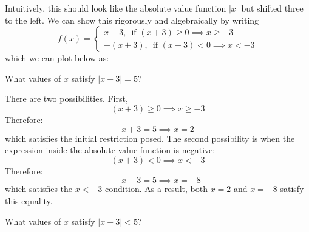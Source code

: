\begin{itemize}
\begin{example}
        Intuitively, this should look like the absolute value function $|x|$ but shifted three to the left. We can show this rigorously and algebraically by writing
        \begin{equation}
            f(x)=\begin{cases}
                x+3,\, \text{ if }(x+3)\ge 0 \implies x \ge -3 \\ 
                -(x+3),\, \text{ if }(x+3)<0 \implies x<-3
            \end{cases}
            \label{eq:}
        \end{equation}
        which we can plot below as:
        \begin{center}
        \end{center}
    \end{example}
    \begin{example}
        What values of $x$ satisfy $|x+3|=5$?
        \vspace{2mm}

        There are two possibilities. First,
        \begin{equation}
            (x+3) \ge 0 \implies x \ge -3
            \label{eq:}
        \end{equation}
        Therefore:
        \begin{equation}
            x+3=5 \implies x=2
            \label{eq:}
        \end{equation}
        which satisfies the initial restriction posed. The second possibility is when the expression inside the absolute value function is negative: 
        \begin{equation}
            (x+3) < 0 \implies x < -3
            \label{eq:}
        \end{equation}
        Therefore:
        \begin{equation}
            -x-3=5 \implies x=-8
            \label{eq:}
        \end{equation}
        which satisfies the $x<-3$ condition. As a result, both $x=2$ and $x=-8$ satisfy this equality. 
    \end{example}
    \begin{example}
        What values of $x$ satisfy $|x+3|<5$?
        \vspace{2mm}


\end{example}
\end{itemize}
